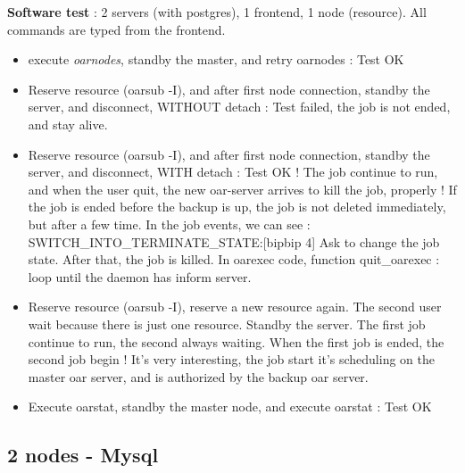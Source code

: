 \documentclass[a4paper,10pt]{report}
\begin{document}
\textbf{Software test} : 2 servers (with postgres), 1 frontend, 1 node (resource). All commands are typed from the frontend.
\begin{itemize}
 \item execute \textit{oarnodes}, standby the master, and retry oarnodes : Test OK
 \item Reserve resource (oarsub -I), and after first node connection, standby the server, and disconnect, WITHOUT detach : Test failed, the job is not ended, and stay alive.
 \item Reserve resource (oarsub -I), and after first node connection, standby the server, and disconnect, WITH detach : Test OK ! The job continue to run, and when the user quit, the new oar-server arrives to kill the job, properly !
If the job is ended before the backup is up, the job is not deleted immediately, but after a few time. In the job events, we  can see : SWITCH\_INTO\_TERMINATE\_STATE:[bipbip 4] Ask to change the job state. After that, the job is killed.
In oarexec code, function quit\_oarexec : loop until the daemon has inform server.
 \item Reserve resource (oarsub -I), reserve a new resource again. The second user wait because there is just one resource. Standby the server. The first job continue to run, the second always waiting. When the first job is ended, the second job begin ! It's very interesting, the job start it's scheduling on the master oar server, and is authorized  by the backup oar server.
 \item Execute oarstat, standby the master node, and execute oarstat : Test OK
\end{itemize}


\subsection{2 nodes - Mysql}
\end{document}
